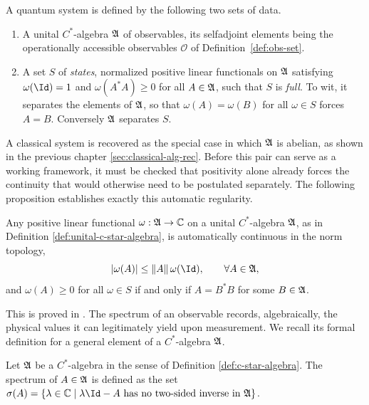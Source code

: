 \begin{definition}\label{def:quantum-system}
	A quantum system is defined by the following two sets of data.
	\begin{enumerate}
		\item A unital $C^*$-algebra $\mathfrak{A}$ of observables, its selfadjoint
		elements being the operationally accessible observables $\mathcal{O}$ of
		Definition~\ref{def:obs-set}.
		\item A set $S$ of \emph{states}, normalized positive linear functionals
		on $\mathfrak{A}$ satisfying $\omega(\Id)=1$ and $\omega(A^*A)\ge0$ for all
		$A\in\mathfrak{A}$, such that $S$ is \emph{full}. To wit, it separates the
		elements of $\mathfrak{A}$, so that $\omega(A)=\omega(B)$ for all $\omega\in S$
		forces $A=B$. Conversely $\mathfrak{A}$ separates $S$.
	\end{enumerate}
\end{definition}

A classical system is recovered as the special case in which $\mathfrak{A}$ is abelian, as shown in the previous chapter \ref{sec:classical-alg-rec}. Before this pair can serve as a working framework, it must be checked that positivity alone already forces the continuity that would otherwise need to be postulated separately. The following proposition establishes exactly this automatic regularity.

\begin{proposition}
	Any positive linear functional $\omega: \mathfrak{A} \to \mathbb{C}$ on a unital $C^*$-algebra $\mathfrak{A}$, as in Definition \ref{def:unital-c-star-algebra}, is
	automatically continuous in the norm topology,
	\[
	|\omega(A)|\le\|A\|\,\omega(\Id), \qquad \forall A\in \A,
	\]
	and $\omega(A)\ge0$ for all $\omega\in S$ if and only if $A=B^*B$ for some
	$B\in \mathfrak{A}$. 
\end{proposition}

This is proved in \cite[Proposition 2.3.11]{bratteliOperatorAlgebrasQuantum1981}.
The spectrum of an observable records, algebraically, the physical values it can legitimately yield upon measurement. We recall its formal definition for a general element of a $C^*$-algebra $\mathfrak{A}$.

\begin{definition}[Spectrum]
	Let $\mathfrak{A}$ be a $C^*$-algebra in the sense of Definition \ref{def:c-star-algebra}. The spectrum of $A\in \mathfrak{A}$ is defined as the set
	$\sigma(A)=\{\lambda\in\C \mid \lambda\Id-A \text{ has no two-sided
		inverse in } \A\}$.
\end{definition}

